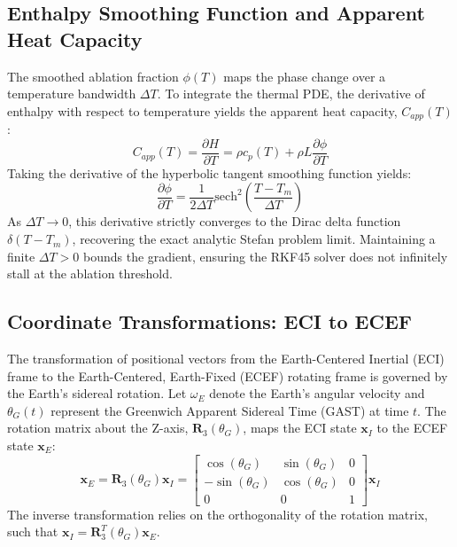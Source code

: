 \documentclass[11pt,a4paper]{article}
\theoremstyle{definition}
\numberwithin{equation}{section}
\begin{document}
\begin{appendices}
\subsection{Enthalpy Smoothing Function and Apparent Heat Capacity}
The smoothed ablation fraction $\phi(T)$ maps the phase change over a temperature bandwidth $\Delta T$. To integrate the thermal PDE, the derivative of enthalpy with respect to temperature yields the apparent heat capacity, $C_{app}(T)$:
\begin{equation}
    C_{app}(T) = \frac{\partial H}{\partial T} = \rho c_p(T) + \rho L \frac{\partial \phi}{\partial T}
\end{equation}
Taking the derivative of the hyperbolic tangent smoothing function yields:
\begin{equation}
    \frac{\partial \phi}{\partial T} = \frac{1}{2 \Delta T} \text{sech}^2\left(\frac{T - T_m}{\Delta T}\right)
\end{equation}
As $\Delta T \to 0$, this derivative strictly converges to the Dirac delta function $\delta(T - T_m)$, recovering the exact analytic Stefan problem limit. Maintaining a finite $\Delta T > 0$ bounds the gradient, ensuring the RKF45 solver does not infinitely stall at the ablation threshold.

\subsection{Coordinate Transformations: ECI to ECEF}
The transformation of positional vectors from the Earth-Centered Inertial (ECI) frame to the Earth-Centered, Earth-Fixed (ECEF) rotating frame is governed by the Earth's sidereal rotation. Let $\omega_E$ denote the Earth's angular velocity and $\theta_{G}(t)$ represent the Greenwich Apparent Sidereal Time (GAST) at time $t$. The rotation matrix about the Z-axis, $\mathbf{R}_3(\theta_G)$, maps the ECI state $\mathbf{x}_I$ to the ECEF state $\mathbf{x}_E$:
\begin{equation}
    \mathbf{x}_E = \mathbf{R}_3(\theta_G) \mathbf{x}_I = 
    \begin{bmatrix}
        \cos(\theta_G) & \sin(\theta_G) & 0 \\
        -\sin(\theta_G) & \cos(\theta_G) & 0 \\
        0 & 0 & 1
    \end{bmatrix}
    \mathbf{x}_I
\end{equation}
The inverse transformation relies on the orthogonality of the rotation matrix, such that $\mathbf{x}_I = \mathbf{R}_3^T(\theta_G) \mathbf{x}_E$.


\end{appendices}
\end{document}
